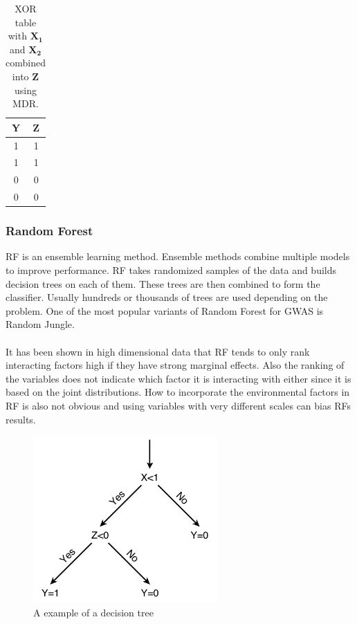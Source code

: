 \documentclass[10pt,a4paper]{report}
\newcounter{example}
\begin{document}
\begin{table}[h]
\begin{tabular}{ | c | c | }
  \hline
  \textbf{Y} & \textbf{Z} \\
  \hline
  1 & 1 \\
  \hline
  1 & 1 \\
  \hline
  0 & 0 \\
  \hline
  0 & 0 \\
  \hline
\end{tabular}
\caption{XOR table with $\mathbf{X_1}$ and $\mathbf{X_2}$ combined into $\mathbf{Z}$ using MDR.}
\label{table:xor_mdr_table}
\end{table}

\subsubsection{Random Forest}
RF is an ensemble learning method\cite{random_forest}. Ensemble methods combine multiple models to improve performance. RF takes randomized samples of the data and builds decision trees on each of them. These trees are then combined to form the classifier. Usually hundreds or thousands of trees are used depending on the problem\cite{random_forest}. One of the most popular variants of Random Forest for GWAS is Random Jungle\cite{random_jungle}.\\
\\
It has been shown in high dimensional data that RF tends to only rank interacting factors high if they have strong marginal effects\cite{winham_rf_2012}. Also the ranking of the variables does not indicate which factor it is interacting with either since it is based on the joint distributions\cite{gene_enviroment_2013}. How to incorporate the environmental factors in RF is also not obvious and using variables with very different scales can bias RFs results\cite{gene_enviroment_2013}.

\begin{figure}[h]
    \centering
    \includegraphics[width=7cm]{Decision_Tree.png}
    \caption{A example of a decision tree}
    \label{fig:DecisionTree}
\end{figure}
\end{document}
